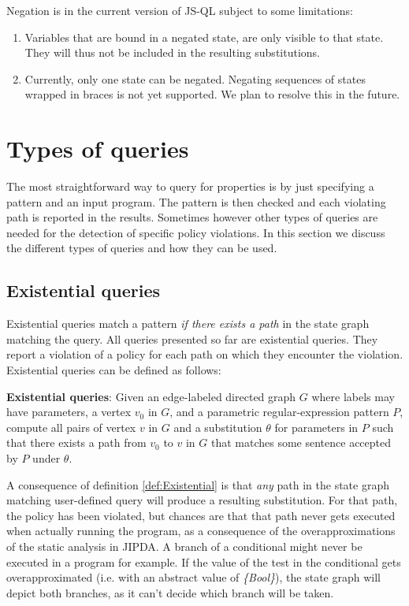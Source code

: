 Negation is in the current version of JS-QL subject to some limitations: 
\begin{enumerate}
\item Variables that are bound in a negated state, are only visible to that state. They will thus not be included in the resulting substitutions.
\item Currently, only one state can be negated. Negating sequences of states wrapped in braces is not yet supported. We plan to resolve this in the future.
\end{enumerate}


\section{Types of queries}
\label{sec:TypesOfQueries}

The most straightforward way to query for properties is by just specifying a pattern and an input program. The pattern is then checked and each violating path is reported in the results. Sometimes however other types of queries are needed for the detection of specific policy violations. In this section we discuss the different types of queries and how they can be used.

\subsection{Existential queries}
Existential queries match a pattern \textit{if there exists a path} in the state graph matching the query. All queries presented so far are existential queries. They report a violation of a policy for each path on which they encounter the violation. Existential queries can be defined as follows:
\begin{definition}
\label{def:Existential}
\textbf{Existential queries}: Given an edge-labeled directed graph $G$ where labels may have parameters, a vertex $v_0$ in $G$, and a parametric regular-expression pattern $P$, compute all pairs of vertex $v$ in $G$ and a substitution $\theta$ for parameters in $P$ such that there exists a path from $v_0$ to $v$ in $G$ that matches some sentence accepted by $P$ under $\theta$.
\end{definition}

\noindent A consequence of definition \ref{def:Existential} is that \textit{any} path in the state graph matching user-defined query will produce a resulting substitution. For that path, the policy has been violated, but chances are that that path never gets executed when actually running the program, as a consequence of the overapproximations of the static analysis in JIPDA. A branch of a conditional might never be executed in a program for example. If the value of the test in the conditional gets overapproximated (i.e. with an abstract value of \textit{\{Bool\}}), the state graph will depict both branches, as it can't decide which branch will be taken. 

